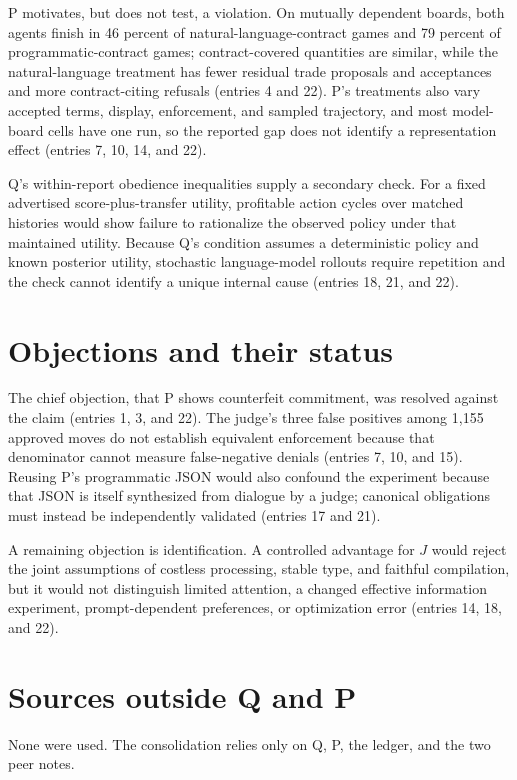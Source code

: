 \documentclass{article}
\begin{document}
P motivates, but does not test, a violation. On mutually dependent boards, both agents finish in 46 percent of natural-language-contract games and 79 percent of programmatic-contract games; contract-covered quantities are similar, while the natural-language treatment has fewer residual trade proposals and acceptances and more contract-citing refusals (entries 4 and 22). P's treatments also vary accepted terms, display, enforcement, and sampled trajectory, and most model-board cells have one run, so the reported gap does not identify a representation effect (entries 7, 10, 14, and 22).

Q's within-report obedience inequalities supply a secondary check. For a fixed advertised score-plus-transfer utility, profitable action cycles over matched histories would show failure to rationalize the observed policy under that maintained utility. Because Q's condition assumes a deterministic policy and known posterior utility, stochastic language-model rollouts require repetition and the check cannot identify a unique internal cause (entries 18, 21, and 22).

\section*{Objections and their status}
The chief objection, that P shows counterfeit commitment, was resolved against the claim (entries 1, 3, and 22). The judge's three false positives among 1,155 approved moves do not establish equivalent enforcement because that denominator cannot measure false-negative denials (entries 7, 10, and 15). Reusing P's programmatic JSON would also confound the experiment because that JSON is itself synthesized from dialogue by a judge; canonical obligations must instead be independently validated (entries 17 and 21).

A remaining objection is identification. A controlled advantage for $J$ would reject the joint assumptions of costless processing, stable type, and faithful compilation, but it would not distinguish limited attention, a changed effective information experiment, prompt-dependent preferences, or optimization error (entries 14, 18, and 22).

\section*{Sources outside Q and P}
None were used. The consolidation relies only on Q, P, the ledger, and the two peer notes.
\end{document}
